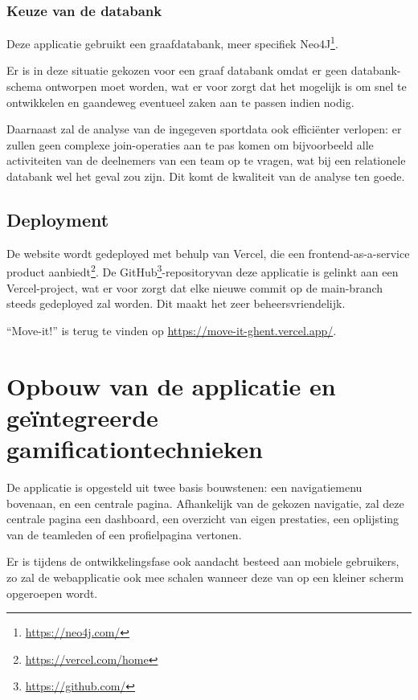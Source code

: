\subsubsection{Keuze van de databank}

Deze applicatie gebruikt een graafdatabank, meer specifiek Neo4J\footnote{\href{https://neo4j.com/}{https://neo4j.com/}}.

Er is in deze situatie gekozen voor een graaf databank omdat er geen databank-schema ontworpen moet worden, wat er voor zorgt dat het mogelijk is om snel te ontwikkelen en gaandeweg eventueel zaken aan te passen indien nodig.

Daarnaast zal de analyse van de ingegeven sportdata ook efficiënter verlopen: er zullen geen complexe join-operaties aan te pas komen om bijvoorbeeld alle activiteiten van de deelnemers van een team op te vragen, wat bij een relationele databank wel het geval zou zijn. Dit komt de kwaliteit van de analyse ten goede.

\subsection{Deployment}

De website wordt gedeployed met behulp van Vercel, die een frontend-as-a-service product aanbiedt\footnote{\href{https://vercel.com/home}{https://vercel.com/home}}. De GitHub\footnote{\href{https://github.com/}{https://github.com/}}-repositoryvan deze applicatie is gelinkt aan een Vercel-project, wat er voor zorgt dat elke nieuwe commit op de main-branch steeds gedeployed zal worden. Dit maakt het zeer beheersvriendelijk.

``Move-it!'' is terug te vinden op \href{https://move-it-ghent.vercel.app/}{https://move-it-ghent.vercel.app/}.

\section{Opbouw van de applicatie en geïntegreerde gamificationtechnieken}

De applicatie is opgesteld uit twee basis bouwstenen: een navigatiemenu bovenaan, en een centrale pagina. Afhankelijk van de gekozen navigatie, zal deze centrale pagina een dashboard, een overzicht van eigen prestaties, een oplijsting van de teamleden of een profielpagina vertonen.

Er is tijdens de ontwikkelingsfase ook aandacht besteed aan mobiele gebruikers, zo zal de webapplicatie ook mee schalen wanneer deze van op een kleiner scherm opgeroepen wordt.

